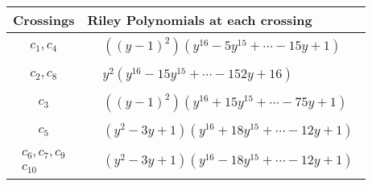 \documentclass[1p]{elsarticle_modified}
\theoremstyle{definition}
\begin{document}
\begin{tabular}{m{50pt}|m{274pt}}
Crossings & \hspace{64pt}Riley Polynomials at each crossing \\
\hline $$\begin{aligned}c_{1},c_{4}\end{aligned}$$&$\begin{aligned}
&((y-1)^2)(y^{16}-5 y^{15}+\cdots-15 y+1)
\end{aligned}$\\
\hline $$\begin{aligned}c_{2},c_{8}\end{aligned}$$&$\begin{aligned}
&y^2(y^{16}-15 y^{15}+\cdots-152 y+16)
\end{aligned}$\\
\hline $$\begin{aligned}c_{3}\end{aligned}$$&$\begin{aligned}
&((y-1)^2)(y^{16}+15 y^{15}+\cdots-75 y+1)
\end{aligned}$\\
\hline $$\begin{aligned}c_{5}\end{aligned}$$&$\begin{aligned}
&(y^2-3 y+1)(y^{16}+18 y^{15}+\cdots-12 y+1)
\end{aligned}$\\
\hline $$\begin{aligned}c_{6},c_{7},c_{9}\\c_{10}\end{aligned}$$&$\begin{aligned}
&(y^2-3 y+1)(y^{16}-18 y^{15}+\cdots-12 y+1)
\end{aligned}$\\
\hline
\end{tabular}
\vskip 2pc
\end{document}
